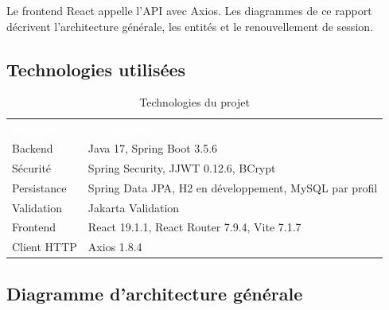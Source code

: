 \documentclass[11pt,a4paper]{article}
\newcommand{\hdr}[1]{\textcolor{white}{\textbf{#1}}}
\newcommand{\tablehead}{\rowcolor{primary}}
\begin{document}
Le frontend React appelle l'API avec Axios. Les diagrammes de ce rapport décrivent l'architecture générale, les entités et le renouvellement de session.

\subsection{Technologies utilisées}

\begin{table}[H]
\centering
\caption{Technologies du projet}\label{tab:techno}
\begin{tabularx}{\linewidth}{@{}>{\raggedright\arraybackslash}p{3.2cm}X@{}}
\tablehead \hdr{Domaine} & \hdr{Technologie} \\
Backend      & Java 17, Spring Boot 3.5.6 \\
\rowcolor{soft} Sécurité     & Spring Security, JJWT 0.12.6, BCrypt \\
Persistance  & Spring Data JPA, H2 en développement, MySQL par profil \\
\rowcolor{soft} Validation   & Jakarta Validation \\
Frontend     & React 19.1.1, React Router 7.9.4, Vite 7.1.7 \\
\rowcolor{soft} Client HTTP  & Axios 1.8.4 \\
\end{tabularx}
\end{table}

\subsection{Diagramme d'architecture générale}
\end{document}
